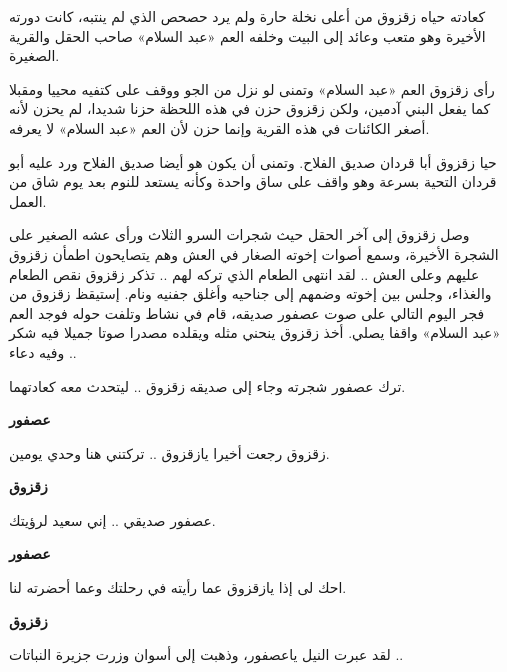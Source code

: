 \documentclass[12pt]{article}
\newlength{\SpeakerGutter}
\newlength{\DialogueGap}
\newlength{\StoryBodyWidth}
\newcommand{\Narration}[1]{%
  \par
  \noindent
  \begin{minipage}[t]{\StoryBodyWidth}
    \RaggedLeft
    #1
  \end{minipage}
  \par
}
\newcommand{\DialogueLine}[2]{%
  \par\addvspace{0.75\baselineskip}
  \noindent
  \begin{minipage}[t]{\SpeakerGutter}
    \RaggedLeft
    \bfseries #1
  \end{minipage}%
  \hspace{\DialogueGap}%
  \begin{minipage}[t]{\StoryBodyWidth}
    \RaggedLeft
    #2
  \end{minipage}%
  \par
}
\newcommand{\TextOnlyPage}[1]{%
  \clearpage
  \thispagestyle{empty}
  \vspace*{2mm}
  #1
  \clearpage
}
\begin{document}
\TextOnlyPage{%
  \Narration{كعادته حياه زقزوق من أعلى نخلة حارة ولم يرد حصحص الذي لم ينتبه، كانت دورته الأخيرة وهو متعب وعائد إلى البيت وخلفه العم «عبد السلام» صاحب الحقل والقرية الصغيرة.}

  \Narration{رأى زقزوق العم «عبد السلام» وتمنى لو نزل من الجو ووقف على كتفيه محييا ومقبلا كما يفعل البني آدمين، ولكن زقزوق حزن في هذه اللحظة حزنا شديدا، لم يحزن لأنه أصغر الكائنات في هذه القرية وإنما حزن لأن العم «عبد السلام» لا يعرفه.}

  \Narration{حيا زقزوق أبا قردان صديق الفلاح. وتمنى أن يكون هو أيضا صديق الفلاح ورد عليه أبو قردان التحية بسرعة وهو واقف على ساق واحدة وكأنه يستعد للنوم بعد يوم شاق من العمل.}

  \Narration{وصل زقزوق إلى آخر الحقل حيث شجرات السرو الثلاث ورأى عشه الصغير على الشجرة الأخيرة، وسمع أصوات إخوته الصغار في العش وهم يتصايحون اطمأن زقزوق عليهم وعلى العش .. لقد انتهى الطعام الذي تركه لهم .. تذكر زقزوق نقص الطعام والغذاء، وجلس بين إخوته وضمهم إلى جناحيه وأغلق جفنيه ونام. إستيقظ زقزوق من فجر اليوم التالي على صوت عصفور صديقه، قام في نشاط وتلفت حوله فوجد العم «عبد السلام» واقفا يصلي. أخذ زقزوق ينحني مثله ويقلده مصدرا صوتا جميلا فيه شكر وفيه دعاء ..}

  \Narration{ترك عصفور شجرته وجاء إلى صديقه زقزوق .. ليتحدث معه كعادتهما.}

  \DialogueLine{عصفور}{زقزوق رجعت أخيرا يازقزوق .. تركتني هنا وحدي يومين.}
  \DialogueLine{زقزوق}{عصفور صديقي .. إني سعيد لرؤيتك.}
  \DialogueLine{عصفور}{احك لى إذا يازقزوق عما رأيته في رحلتك وعما أحضرته لنا.}
  \DialogueLine{زقزوق}{لقد عبرت النيل ياعصفور، وذهبت إلى أسوان وزرت جزيرة النباتات ..}
}
\end{document}

